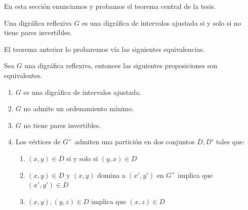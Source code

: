 En esta sección enunciamos y probamos el teorema central de la tesis. 

\begin{teorema}
    Una digráfica reflexiva $G$ es una digráfica de intervalos ajustada si y solo si no tiene pares invertibles.
\end{teorema}

El teorema anterior lo probaremos vía las siguientes equivalencias.

 \begin{teorema}
     Sea $G$ una digráfica reflexiva, entonces las siguientes proposiciones son equivalentes.
\begin{enumerate}
  \item $G$ es una digráfica de intervalos ajustada.
  \item $G$ no admite un ordenamiento mínimo.
  \item $G$ no tiene pares invertibles.
  \item Los vértices de $G^+$ admiten una partici\'on en dos conjuntos $D, D'$ tales que:
        \begin{enumerate}
            \item $(x,y)\in D $ si y solo si $ (y,x) \in D$
            \item $(x,y)\in D$ y $(x,y)$ domina a $(x',y')$ en $G^+$ implica que $(x',y')\in D$
            \item $(x,y), (y,z)\in D$ implica que $(x,z)\in D$
        \end{enumerate}
\end{enumerate}


\end{teorema}
